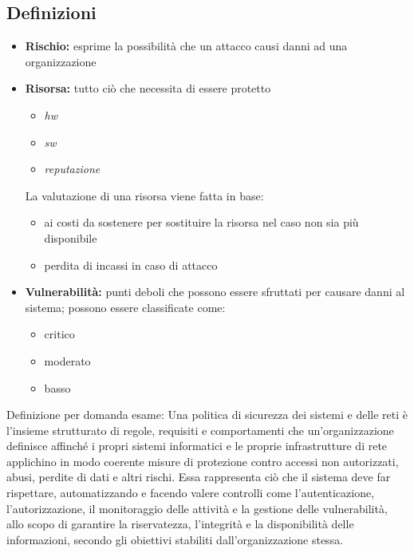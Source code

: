 \documentclass{report}
\begin{document}
\subsection{Definizioni}
\begin{itemize}
    \item \textbf{Rischio:} esprime la possibilità che un attacco causi danni ad una 
    organizzazione
    \item \textbf{Risorsa:} tutto ciò che necessita di essere protetto
    \begin{itemize}
        \item \textit{hw}
        \item \textit{sw}
        \item \textit{reputazione}
    \end{itemize}
    
    \noindent La valutazione di una risorsa viene fatta in base:
    \begin{itemize}
        \item ai costi da sostenere per sostituire la risorsa nel caso non sia più disponibile 
        \item perdita di incassi in caso di attacco 
    \end{itemize}
    \item \textbf{Vulnerabilità:} punti deboli che possono essere sfruttati per causare danni al 
    sistema; possono essere classificate come:
    \begin{itemize}
        \item critico 
        \item moderato 
        \item basso
    \end{itemize}
\end{itemize}

\noindent Definizione per domanda esame: Una politica di sicurezza dei sistemi e delle reti è l'insieme strutturato di regole, requisiti e comportamenti che un'organizzazione definisce affinché i propri sistemi informatici e le proprie infrastrutture di rete applichino in modo coerente misure di protezione contro accessi non autorizzati, abusi, perdite di dati e altri rischi. Essa rappresenta ciò che il sistema deve far rispettare, automatizzando e facendo valere controlli come l'autenticazione, l'autorizzazione, il monitoraggio delle attività e la gestione delle vulnerabilità, allo scopo di garantire la riservatezza, l’integrità e la disponibilità delle informazioni, secondo gli obiettivi stabiliti dall'organizzazione stessa.
\end{document}

